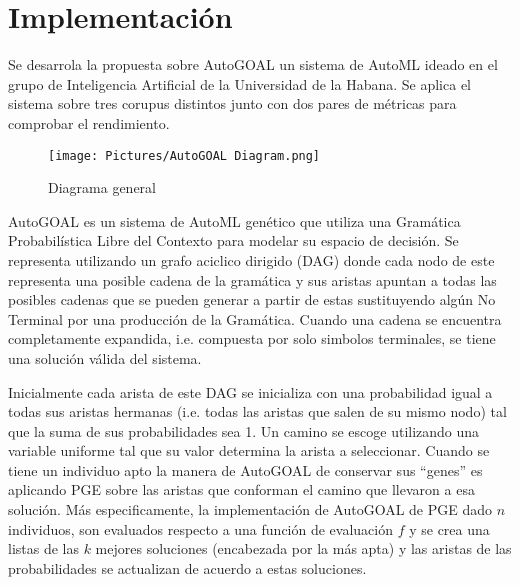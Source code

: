 \chapter{Implementación}\label{chapter:implementation}



Se desarrola la propuesta sobre AutoGOAL un sistema de AutoML ideado en el grupo de Inteligencia Artificial de la Universidad de la Habana.
Se aplica el sistema sobre tres corupus distintos junto con dos pares de m\'etricas para comprobar el rendimiento.


\begin{figure}[ht]
    \centering
    \texttt{[image: Pictures/AutoGOAL Diagram.png]}
    \caption{Diagrama general}
    \label{impl:fig:general_diagram}
\end{figure}


AutoGOAL es un sistema de AutoML gen\'etico que utiliza una Gram\'atica Probabil\'istica Libre del Contexto  para modelar su espacio de decisi\'on. Se representa utilizando un grafo aciclico dirigido (DAG) donde cada nodo de este representa una posible cadena de la gram\'atica y sus aristas apuntan a todas las posibles cadenas que se pueden generar a partir de estas sustituyendo alg\'un No Terminal por una producci\'on de la Gram\'atica. Cuando una cadena se encuentra completamente expandida, i.e. compuesta por solo simbolos terminales, se tiene una soluci\'on v\'alida del sistema. 

Inicialmente cada arista de este DAG se inicializa con una probabilidad igual a todas sus aristas hermanas (i.e. todas las aristas que salen de su mismo nodo) tal que la suma de sus probabilidades sea 1. Un camino se escoge utilizando una variable uniforme tal que su valor determina la arista a seleccionar. Cuando se tiene un individuo apto la manera de AutoGOAL de conservar sus ``genes'' es aplicando PGE sobre las aristas que conforman el camino que llevaron a esa soluci\'on. M\'as especificamente, la implementaci\'on de AutoGOAL de PGE dado $n$ individuos, son evaluados respecto a una funci\'on de evaluaci\'on $f$ y se crea una listas de las $k$ mejores soluciones (encabezada por la m\'as apta) y las aristas de las probabilidades se actualizan de acuerdo a estas soluciones. 

